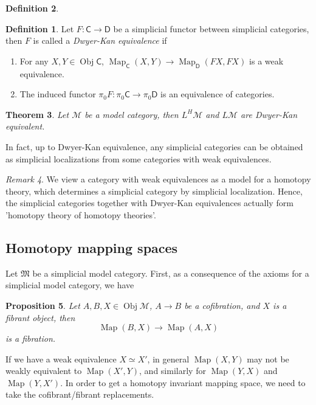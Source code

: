 \documentclass[12pt]{amsart}
\newtheorem{thm}{Theorem}[section]
\newtheorem{prop}[thm]{Proposition}
\theoremstyle{definition}
\newtheorem{defn}[thm]{Definition}
\theoremstyle{remark}
\newtheorem{rem}[thm]{Remark}
\numberwithin{equation}{section}
\newcommand{\CC}{{\mathsf C}}
\newcommand{\CD}{{\mathsf D}}
\newcommand{\cm}{{\mathcal{M}}}
\newcommand{\1}{{\mathbb{1}}}
\newcommand{\ob}{\operatorname{Obj}}
\newcommand{\M}{{\mathfrak{M}}}
\newcommand{\map}{\operatorname{Map}}
\begin{document}
\begin{defn}
	\begin{defn}
		Let $F:\CC \to \CD$ be a simplicial functor between simplicial categories, then $F$ is called a {\it Dwyer-Kan equivalence} if 
	    \begin{enumerate}
	    	\item For any $X, Y \in \ob \CC$, $\map_{\CC}(X,Y) \to \map_{\CD}(FX,FX)$ is a weak equivalence.
	    	\item The induced functor $\pi_0 F: \pi_0 \CC \to \pi_0 \CD$ is an equivalence of categories.
	    \end{enumerate}
	\end{defn} 
\end{defn}

\begin{thm}
	Let $\cm$ be a model category, then $L^H\cm$ and $L\cm$ are Dwyer-Kan equivalent.
\end{thm}

In fact, up to Dwyer-Kan equivalence, any simplicial categories can be obtained as simplicial localizations from some categories with weak equivalences.

\begin{rem}
	We view a category with weak equivalences as a model for a homotopy theory, which determines a simplicial category by simplicial localization. Hence, the simplicial categories together with Dwyer-Kan equivalences actually form 'homotopy theory of homotopy theories'.
\end{rem}

\subsection{Homotopy mapping spaces}
Let $\M$ be a simplicial model category. First, as a consequence of the axioms for a simplicial model category, we have 
\begin{prop}
	Let $A, B, X \in \ob \cm$, $A\to B$ be a cofibration, and $X$ is a fibrant object, then 
	\begin{equation*}
	\map(B,X) \to \map (A,X)
	\end{equation*}
	is a fibration.
\end{prop}

If we have a weak equivalence $X\simeq X'$, in general $\map(X,Y)$ may not be weakly equivalent to $\map (X',Y)$, and similarly for $\map(Y,X)$ and $\map (Y,X')$. In order to get a homotopy invariant mapping space, we need to take the cofibrant/fibrant replacements.
\end{document}
